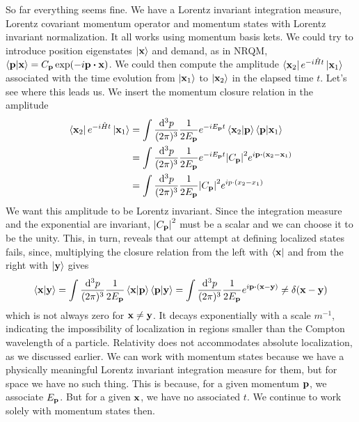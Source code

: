 So far everything seems fine. We have a Lorentz invariant integration measure, Lorentz covariant momentum operator and momentum states with Lorentz invariant normalization. It all works using momentum basis kets.
We could try to introduce position eigenstates $\ket{\vb{x}}$ and demand, as in NRQM, $\braket{\vb{p}}{\vb{x}}=C_{\vb{p}}\exp(-i\vb{p}\vdot\vb{x})$. We could then compute the amplitude $ \bra{\vb{x}_2}e^{-i\hat{H}t}\ket{\vb{x}_1}$ associated with the time evolution from $\ket{\vb{x}_1}$ to $\ket{\vb{x}_2}$ in the elapsed time $t$. Let's see where this leads us. We insert the momentum closure relation in the amplitude
\begin{equation}
\begin{aligned}
    \bra{\vb{x}_2}e^{-i\hat{H}t}\ket{\vb{x}_1}&=\int\frac{\dd^3p}{(2\pi)^3}\frac{1}{2E_{\vb{p}}}e^{-iE_{\vb{p}}t}\braket{\vb{x}_2}{\vb{p}}\braket{\vb{p}}{\vb{x}_1}\\
    &=\int\frac{\dd^3p}{(2\pi)^3}\frac{1}{2E_{\vb{p}}}e^{-iE_{\vb{p}}t}\abs{C_{\vb{p}}}^2 e^{i\vb{p}\vdot(\vb{x}_2-\vb{x}_1)}\\
    &=\int\frac{\dd^3p}{(2\pi)^3}\frac{1}{2E_{\vb{p}}}\abs{C_{\vb{p}}}^2
    e^{i{p}\cdot(x_2-x_1)}
\end{aligned}
\end{equation}
We want this amplitude to be Lorentz invariant. Since the integration measure and the exponential are invariant, $\abs{C_{\vb{p}}}^2$ must be a scalar and we can choose it to be the unity. This, in turn, reveals that our attempt at defining localized states fails, since, multiplying the closure relation from the left with $\bra{\vb{x}}$ and from the right with $\ket{\vb{y}}$ gives
\begin{equation}
    \braket{\vb{x}}{\vb{y}}=\int\frac{\dd^3p}{(2\pi)^3}\frac{1}{2E_{\vb{p}}}\braket{\vb{x}}{\vb{p}}\braket{\vb{p}}{\vb{y}}=\int\frac{\dd^3p}{(2\pi)^3}\frac{1}{2E_{\vb{p}}}e^{i\vb{p}\vdot(\vb{x}-\vb{y})}\neq\delta(\vb{x}-\vb{y})
\end{equation}
which is not always zero for $\vb{x}\neq\vb{y}$. It decays exponentially with a scale $m^{-1}$, indicating the impossibility of localization in regions smaller than the Compton wavelength of a particle. Relativity does not accommodates absolute localization, as we discussed earlier. We can work with momentum states because we have a physically meaningful Lorentz invariant integration measure for them, but for space we have no such thing. This is because, for a given momentum $\vb{p}$, we  associate $E_{\vb{p}}$. But for a given $\vb{x}$, we have no associated $t$. We continue to work solely with momentum states then. \\

